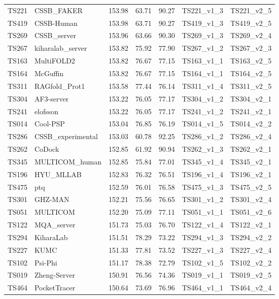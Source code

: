 \begin{longtable}{lllllll}
TS221 & CSSB\_FAKER & 153.98 & 63.71 & 90.27 & TS221\_v1\_3 & TS221\_v2\_5 \\ 
TS419 & CSSB-Human & 153.98 & 63.71 & 90.27 & TS419\_v1\_3 & TS419\_v2\_5 \\ 
TS269 & CSSB\_server & 153.96 & 63.66 & 90.30 & TS269\_v1\_3 & TS269\_v2\_4 \\ 
TS267 & kiharalab\_server & 153.82 & 75.92 & 77.90 & TS267\_v1\_2 & TS267\_v2\_3 \\ 
TS163 & MultiFOLD2 & 153.82 & 76.67 & 77.15 & TS163\_v1\_1 & TS163\_v2\_5 \\ 
TS164 & McGuffin & 153.82 & 76.67 & 77.15 & TS164\_v1\_1 & TS164\_v2\_5 \\ 
TS311 & RAGfold\_Prot1 & 153.58 & 77.44 & 76.14 & TS311\_v1\_4 & TS311\_v2\_5 \\ 
TS304 & AF3-server & 153.22 & 76.05 & 77.17 & TS304\_v1\_2 & TS304\_v2\_1 \\ 
TS241 & elofsson & 153.22 & 76.05 & 77.17 & TS241\_v1\_2 & TS241\_v2\_1 \\ 
TS014 & Cool-PSP & 153.04 & 76.85 & 76.19 & TS014\_v1\_5 & TS014\_v2\_2 \\ 
TS286 & CSSB\_experimental & 153.03 & 60.78 & 92.25 & TS286\_v1\_2 & TS286\_v2\_4 \\ 
TS262 & CoDock & 152.85 & 61.92 & 90.94 & TS262\_v1\_3 & TS262\_v2\_1 \\ 
TS345 & MULTICOM\_human & 152.85 & 75.84 & 77.01 & TS345\_v1\_4 & TS345\_v2\_1 \\ 
TS196 & HYU\_MLLAB & 152.83 & 76.32 & 76.51 & TS196\_v1\_4 & TS196\_v2\_1 \\ 
TS475 & ptq & 152.59 & 76.01 & 76.58 & TS475\_v1\_3 & TS475\_v2\_5 \\ 
TS301 & GHZ-MAN & 152.21 & 75.56 & 76.65 & TS301\_v1\_2 & TS301\_v2\_4 \\ 
TS051 & MULTICOM & 152.20 & 75.09 & 77.11 & TS051\_v1\_1 & TS051\_v2\_6 \\ 
TS122 & MQA\_server & 151.73 & 75.03 & 76.70 & TS122\_v1\_4 & TS122\_v2\_1 \\ 
TS294 & KiharaLab & 151.51 & 78.29 & 73.22 & TS294\_v1\_3 & TS294\_v2\_2 \\ 
TS227 & KUMC & 151.33 & 77.81 & 73.52 & TS227\_v1\_3 & TS227\_v2\_4 \\ 
TS102 & Psi-Phi & 151.17 & 78.38 & 72.79 & TS102\_v1\_5 & TS102\_v2\_2 \\ 
TS019 & Zheng-Server & 150.91 & 76.56 & 74.36 & TS019\_v1\_1 & TS019\_v2\_5 \\ 
TS464 & PocketTracer & 150.64 & 73.69 & 76.96 & TS464\_v1\_1 & TS464\_v2\_4 \\ 

\end{longtable}
